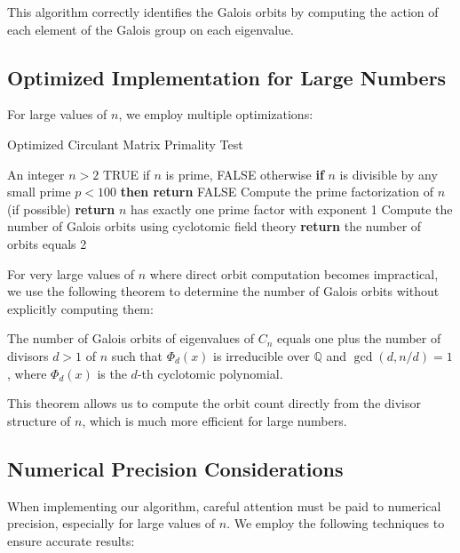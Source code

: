 This algorithm correctly identifies the Galois orbits by computing the action of each element of the Galois group on each eigenvalue.

\subsection{Optimized Implementation for Large Numbers}

For large values of $n$, we employ multiple optimizations:

\begin{algorithm}
\caption{Optimized Circulant Matrix Primality Test}
\begin{algorithmic}[1]
\REQUIRE An integer $n > 2$
\ENSURE TRUE if $n$ is prime, FALSE otherwise
\STATE \textbf{if} $n$ is divisible by any small prime $p < 100$ \textbf{then return} FALSE
\STATE Compute the prime factorization of $n$ (if possible)
    \STATE \textbf{return} $n$ has exactly one prime factor with exponent 1
\ELSE
    \STATE Compute the number of Galois orbits using cyclotomic field theory
    \STATE \textbf{return} the number of orbits equals 2
\ENDIF
\end{algorithmic}
\end{algorithm}

For very large values of $n$ where direct orbit computation becomes impractical, we use the following theorem to determine the number of Galois orbits without explicitly computing them:

\begin{theorem}
The number of Galois orbits of eigenvalues of $C_n$ equals one plus the number of divisors $d > 1$ of $n$ such that $\Phi_d(x)$ is irreducible over $\mathbb{Q}$ and $\gcd(d, n/d) = 1$, where $\Phi_d(x)$ is the $d$-th cyclotomic polynomial.
\end{theorem}

This theorem allows us to compute the orbit count directly from the divisor structure of $n$, which is much more efficient for large numbers.

\subsection{Numerical Precision Considerations}

When implementing our algorithm, careful attention must be paid to numerical precision, especially for large values of $n$. We employ the following techniques to ensure accurate results:

